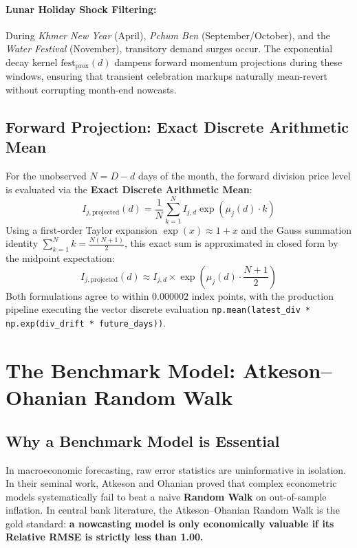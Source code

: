 \documentclass[a4paper, 11pt]{article}
\begin{document}
\paragraph{Lunar Holiday Shock Filtering:}
During \textit{Khmer New Year} (April), \textit{Pchum Ben} (September/October), and the \textit{Water Festival} (November), transitory demand surges occur. The exponential decay kernel $\text{fest}_{\text{prox}}(d)$ dampens forward momentum projections during these windows, ensuring that transient celebration markups naturally mean-revert without corrupting month-end nowcasts.

\subsection{Forward Projection: Exact Discrete Arithmetic Mean}
For the unobserved $N = D - d$ days of the month, the forward division price level is evaluated via the \textbf{Exact Discrete Arithmetic Mean}:
\begin{equation}
    \boxed{I_{j, \text{projected}}(d) = \frac{1}{N} \sum_{k=1}^N I_{j, d} \exp\left( \mu_j(d) \cdot k \right)}
\end{equation}
Using a first-order Taylor expansion $\exp(x) \approx 1 + x$ and the Gauss summation identity $\sum_{k=1}^N k = \frac{N(N+1)}{2}$, this exact sum is approximated in closed form by the midpoint expectation:
\begin{equation}
    I_{j, \text{projected}}(d) \approx I_{j, d} \times \exp\left( \mu_j(d) \cdot \frac{N + 1}{2} \right)
\end{equation}
Both formulations agree to within $0.000002$ index points, with the production pipeline executing the vector discrete evaluation \texttt{np.mean(latest\_div * np.exp(div\_drift * future\_days))}.

\section{The Benchmark Model: Atkeson--Ohanian Random Walk}

\subsection{Why a Benchmark Model is Essential}
In macroeconomic forecasting, raw error statistics are uninformative in isolation. In their seminal work, Atkeson and Ohanian \cite{atkeson2001phillips} proved that complex econometric models systematically fail to beat a naive \textbf{Random Walk} on out-of-sample inflation. In central bank literature, the Atkeson--Ohanian Random Walk is the gold standard: \textbf{a nowcasting model is only economically valuable if its Relative RMSE is strictly less than 1.00.}
\end{document}
